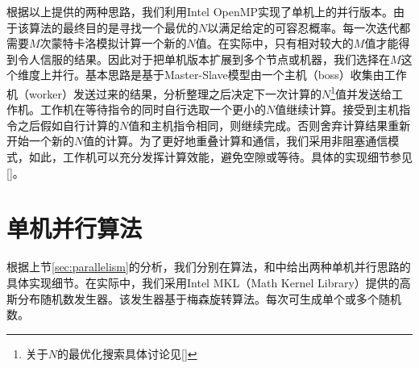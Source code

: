 根据以上提供的两种思路，我们利用Intel OpenMP实现了单机上的并行版本。由于该算法的最终目的是寻找一个最优的$N$以满足给定的可容忍概率。每一次迭代都需要$M$次蒙特卡洛模拟计算一个新的$N$值。在实际中，只有相对较大的$M$值才能得到令人信服的结果。因此对于把单机版本扩展到多个节点或机器，我们选择在$M$这个维度上并行。基本思路是基于Master-Slave模型由一个主机（boss）收集由工作机（worker）发送过来的结果，分析整理之后决定下一次计算的$N$\footnote{关于$N$的最优化搜索具体讨论见\ref{}}值并发送给工作机。工作机在等待指令的同时自行选取一个更小的$N$值继续计算。接受到主机指令之后假如自行计算的$N$值和主机指令相同，则继续完成。否则舍弃计算结果重新开始一个新的$N$值的计算。为了更好地重叠计算和通信，我们采用非阻塞通信模式，如此，工作机可以充分发挥计算效能，避免空隙或等待。具体的实现细节参见\ref{}。

\section{单机并行算法}
\label{sec:monoparallel}
根据上节\ref{sec:parallelism}的分析，我们分别在算法\label{alg:omp1}，\label{alg:omp2_1}和\label{alg:omp2_2}中给出两种单机并行思路的具体实现细节。在实际中，我们采用Intel MKL（Math Kernel Library）提供的高斯分布随机数发生器。该发生器基于梅森旋转算法。每次可生成单个或多个随机数。
